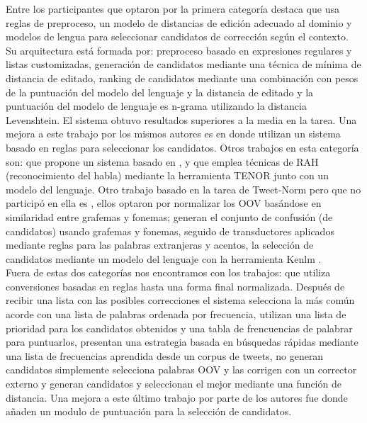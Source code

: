 \documentclass[spanish,12pt, a4paper,twoside]{paper}
\begin{document}
Entre los participantes que optaron por la primera categoría destaca \cite{ruizcuadros:2013}\cite{vicomtech} que usa reglas de preproceso, un modelo de distancias de edición adecuado al dominio y modelos de lengua para seleccionar candidatos de corrección según el contexto. Su arquitectura está formada por: preproceso basado en expresiones regulares y listas customizadas, generación de candidatos mediante una técnica de mínima de distancia de editado, ranking de candidatos mediante una combinación con pesos de la puntuación del modelo del lenguaje y la distancia de editado y la puntuación del modelo de lenguaje es n-grama utilizando la distancia Levenshtein. El sistema obtuvo resultados superiores a la media en la tarea. Una mejora a este trabajo por los mismos autores es \cite{ruizcuadros:2014} en donde utilizan un sistema basado en reglas para seleccionar los candidatos. Otros trabajos en esta categoría son: \cite{gamallo:2013} que propone un sistema basado en \cite{han:2013}, \cite{saralegi:2013} y \cite{mosqueralopezmoreda:2013} que emplea técnicas de RAH (reconocimiento del habla) mediante la herramienta TENOR \cite{mosquera:2012} junto con un modelo del lenguaje. Otro trabajo basado en la tarea de Tweet-Norm pero que no participó en ella es \cite{ceronguzman:2016}, ellos optaron por normalizar los OOV basándose en similaridad entre grafemas y fonemas; generan el conjunto de confusión (de candidatos) usando grafemas y fonemas, seguido de transductores aplicados mediante reglas para las palabras extranjeras y acentos, la selección de candidatos mediante un modelo del lenguaje con la herramienta Kenlm \cite{heafield:2011}.\\

Fuera de estas dos categorías nos encontramos con los trabajos: \cite{montejo:2013} que utiliza conversiones basadas en reglas hasta una forma final normalizada. Después de recibir una lista con las posibles correcciones el sistema selecciona la más común acorde con una lista de palabras ordenada por frecuencia, \cite{vilares:2013} utilizan una lista de prioridad para los candidatos obtenidos y una tabla de frencuencias de palabrar para puntuarlos, \cite{han:2013} presentan una estrategia basada en búsquedas rápidas mediante una lista de frecuencias aprendida desde un corpus de tweets, \cite{munozgarcia:2013} no generan candidatos simplemente selecciona palabras OOV y las corrigen con un corrector externo y \cite{cotelo:2013} generan candidatos y seleccionan el mejor mediante una función de distancia. Una mejora a este último trabajo por parte de los autores fue \cite{cotelocruz:2015} donde añaden un modulo de puntuación para la selección de candidatos. \\
\end{document}
